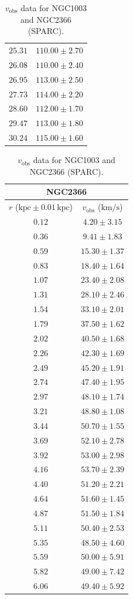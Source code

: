 \documentclass{article}
\newcommand\kpc{\textrm{kpc}}
\newcommand\kmps{\textrm{km}/\textrm{s}}
\newcommand\vobs{\ensuremath{v_{\textrm{obs}}}}
\begin{document}
\begin{table}[h!]
\begin{tabular}{|c|c|}
        $25.31$ & $110.00 \pm 2.70$ \\
        $26.08$ & $110.00 \pm 2.40$ \\
        $26.95$ & $113.00 \pm 2.50$ \\
        $27.73$ & $114.00 \pm 2.20$ \\
        $28.60$ & $112.00 \pm 1.70$ \\
        $29.47$ & $113.00 \pm 1.80$ \\
        $30.24$ & $115.00 \pm 1.60$ \\
        \hline
    \end{tabular}
    \hfill
    \begin{tabular}{|c|c|}
        \hline
        \multicolumn{2}{|c|}{NGC2366} \\
        \hline
        $r$ ($\kpc \pm 0.01 \,\kpc$) & $\vobs$ ($\kmps$) \\
        \hline
        $0.12$ & $4.20 \pm 3.15$ \\
        $0.36$ & $9.41 \pm 1.83$ \\
        $0.59$ & $15.30 \pm 1.37$ \\
        $0.83$ & $18.40 \pm 1.64$ \\
        $1.07$ & $23.40 \pm 2.08$ \\
        $1.31$ & $28.10 \pm 2.46$ \\
        $1.54$ & $33.10 \pm 2.01$ \\
        $1.79$ & $37.50 \pm 1.62$ \\
        $2.02$ & $40.50 \pm 1.68$ \\
        $2.26$ & $42.30 \pm 1.69$ \\
        $2.49$ & $45.20 \pm 1.91$ \\
        $2.74$ & $47.40 \pm 1.95$ \\
        $2.97$ & $48.10 \pm 1.74$ \\
        $3.21$ & $48.80 \pm 1.08$ \\
        $3.44$ & $50.70 \pm 1.55$ \\
        $3.69$ & $52.10 \pm 2.78$ \\
        $3.92$ & $53.00 \pm 2.98$ \\
        $4.16$ & $53.70 \pm 2.39$ \\
        $4.40$ & $51.20 \pm 2.21$ \\
        $4.64$ & $51.60 \pm 1.45$ \\
        $4.87$ & $51.50 \pm 1.84$ \\
        $5.11$ & $50.40 \pm 2.53$ \\
        $5.35$ & $48.50 \pm 4.60$ \\
        $5.59$ & $50.00 \pm 5.91$ \\
        $5.82$ & $49.00 \pm 7.42$ \\
        $6.06$ & $49.40 \pm 5.92$ \\
        \hline
    \end{tabular}
    \caption{$\vobs$ data for NGC1003 and NGC2366 (SPARC).}
    \label{tab:raw1003-2366}
\end{table}
\end{document}
